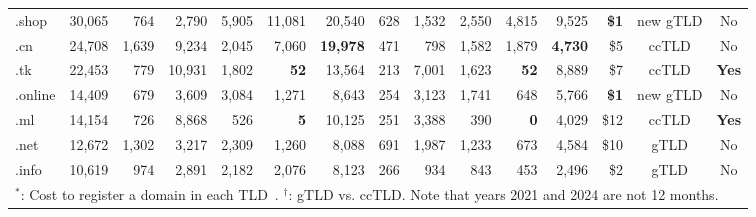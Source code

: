 \begin{table*}[!t]
{\begin{tabular}{lrrrrrrrrrrrrcc}
.shop & 30,065 & 764 & 2,790 & 5,905 & 11,081 & 20,540 & 628 & 1,532 & 2,550 & 4,815 & 9,525 & \textbf{\$1} & new gTLD & No \\
.cn & 24,708 & 1,639 & 9,234 & 2,045 & 7,060 & \cellcolor{bubblegum}\textbf{19,978} & 471 & 798 & 1,582 & 1,879 & \cellcolor{lightgreen}\textbf{4,730} & \$5 & ccTLD & No \\
.tk & 22,453 & 779 & 10,931 & 1,802 & \cellcolor{lightgreen}\textbf{52} & 13,564 & 213 & 7,001 & 1,623 & \cellcolor{lightgreen}\textbf{52} & 8,889 & \$7 & ccTLD & \cellcolor{light-gray}\textbf{Yes} \\
.online & 14,409 &679 & 3,609 & 3,084 & 1,271 & 8,643 & 254 & 3,123 & 1,741 & 648 & 5,766 & \textbf{\$1} & new gTLD & No \\
.ml & 14,154 &726 & 8,868 & 526 & \cellcolor{lightgreen}\textbf{5} & 10,125 & 251 & 3,388 & 390 & \cellcolor{lightgreen}\textbf{0} & 4,029 &\$12 & ccTLD & \cellcolor{light-gray}\textbf{Yes} \\
.net & 12,672 &1,302 & 3,217 & 2,309 & 1,260 & 8,088 & 691 & 1,987 & 1,233 & 673 & 4,584 &  \$10 & gTLD & No \\
.info & 10,619 &974 & 2,891 & 2,182 & 2,076 & 8,123 &  266 & 934 & 843 & 453 & 2,496 & \$2 & gTLD & No \\
\midrule
\multicolumn{15}{l}{${^\ast}$: Cost to register a domain in each TLD~\cite{CompareP38:online}. ${^\dagger}$: gTLD vs. ccTLD. Note that years 2021 and 2024 are not 12 months.}
\end{tabular}
}
\end{table*}